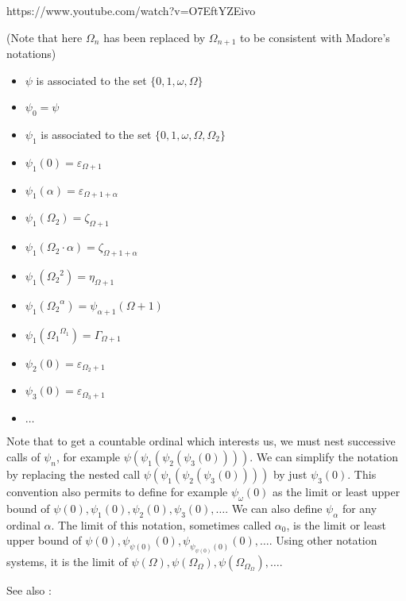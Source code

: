 \documentclass[10pt]{article}
\begin{document}
https://www.youtube.com/watch?v=O7EftYZEivo

(Note that here \( \Omega_n \) has been replaced by \( \Omega_{n+1} \) to be consistent with Madore's notations)

\begin{itemize}
     \setlength{\itemsep}{1pt}
     \setlength{\parskip}{0pt}
     \setlength{\parsep}{0pt}
\item \( \psi \) is associated to the set \( \lbrace 0, 1, \omega, \Omega \rbrace \)
\item \( \psi_0 = \psi \)
\item \( \psi_1 \) is associated to the set \( \lbrace 0, 1, \omega, \Omega, \Omega_2 \rbrace \)
\item \( \psi_1(0) = \varepsilon_{\Omega+1} \)
\item \( \psi_1(\alpha) = \varepsilon_{\Omega+1+\alpha} \)
\item \( \psi_1(\Omega_2) = \zeta_{\Omega+1} \)
\item \( \psi_1(\Omega_2 \cdot \alpha) = \zeta_{\Omega+1+\alpha} \)
\item \( \psi_1({\Omega_2}^2) = \eta_{\Omega+1} \)
\item \( \psi_1({\Omega_2}^\alpha) = \psi_{\alpha+1}(\Omega+1) \)
\item \( \psi_1({\Omega_1}^{\Omega_1}) = \Gamma_{\Omega+1} \)
\item \( \psi_2(0) = \varepsilon_{\Omega_2+1} \)
\item \( \psi_3(0) = \varepsilon_{\Omega_3+1} \)
\item \( \ldots \)
\end{itemize}

Note that to get a countable ordinal which interests us, we must nest successive calls of \( \psi_n \), for example \( \psi(\psi_1(\psi_2(\psi_3(0)))) \). We can simplify the notation by replacing the nested call \( \psi(\psi_1(\psi_2(\psi_3(0)))) \) by just \( \psi_3(0) \). This convention also permits to define for example \( \psi_\omega(0) \) as the limit or least upper bound of \( \psi(0), \psi_1(0), \psi_2(0), \psi_3(0), \ldots \). We can also define \( \psi_\alpha \) for any ordinal \( \alpha \). The limit of this notation, sometimes called \( \alpha_0 \), is the limit or least upper bound of \( \psi(0), \psi_{\psi(0)}(0), \psi_{\psi_{\psi(0)}(0)}(0), \ldots \). Using other notation systems, it is the limit of \( \psi(\Omega), \psi(\Omega_\Omega), \psi(\Omega_{\Omega_\Omega}), \ldots \).

See also :
\end{document}
